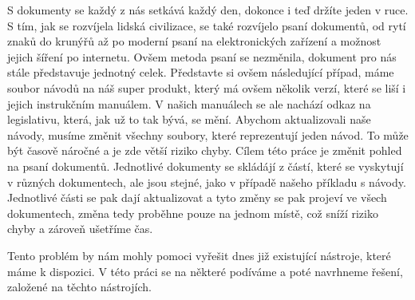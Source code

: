 S dokumenty se každý z nás setkává každý den, dokonce i teď držíte jeden v ruce. S tím, jak se rozvíjela lidská civilizace,
se také rozvíjelo psaní dokumentů, od rytí znaků do krunýřů až po moderní psaní na elektronických zařízení a možnost jejich šíření po internetu.
Ovšem metoda psaní se nezměnila, dokument pro nás stále představuje jednotný celek. Představte si ovšem následující případ, máme soubor návodů na náš super
produkt, který má ovšem několik verzí, které se liší i jejich instrukčním manuálem. V našich manuálech se ale nachází odkaz na legislativu, která, jak už to tak
bývá, se mění. Abychom aktualizovali naše návody, musíme změnit všechny soubory, které reprezentují jeden návod. To může být časově náročné a je zde větší riziko
chyby. Cílem této práce je změnit pohled na psaní dokumentů. Jednotlivé dokumenty se skládájí z částí, které se vyskytují v různých dokumentech, ale jsou stejné,
jako v případě našeho příkladu s návody. Jednotlivé části se pak dají aktualizovat a tyto změny se pak projeví ve všech dokumentech, změna tedy proběhne
pouze na jednom místě, což sníží riziko chyby a zároveň ušetříme čas.

Tento problém by nám mohly pomoci vyřešit dnes již existující nástroje, které máme k dispozici. V této práci se na některé podíváme a poté navrhneme řešení, založené
na těchto nástrojích.